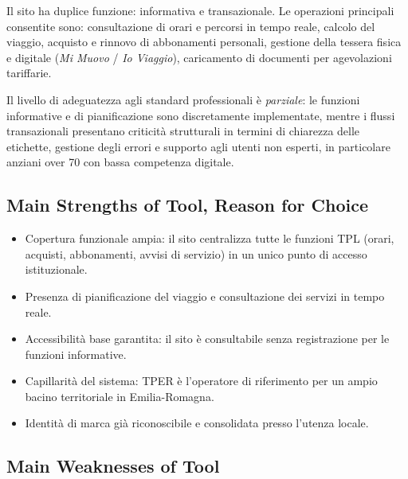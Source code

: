 \documentclass[11pt,a4paper]{article}
\begin{document}
\noindent Il sito ha duplice funzione: informativa e transazionale. Le operazioni principali consentite sono: consultazione di orari e percorsi in tempo reale, calcolo del viaggio, acquisto e rinnovo di abbonamenti personali, gestione della tessera fisica e digitale (\textit{Mi Muovo} / \textit{Io Viaggio}), caricamento di documenti per agevolazioni tariffarie.

\noindent Il livello di adeguatezza agli standard professionali è \textit{parziale}: le funzioni informative e di pianificazione sono discretamente implementate, mentre i flussi transazionali presentano criticità strutturali in termini di chiarezza delle etichette, gestione degli errori e supporto agli utenti non esperti, in particolare anziani over 70 con bassa competenza digitale.

\subsection*{Main Strengths of Tool, Reason for Choice}

\begin{itemize}
    \item Copertura funzionale ampia: il sito centralizza tutte le funzioni TPL (orari, acquisti, abbonamenti, avvisi di servizio) in un unico punto di accesso istituzionale.
    \item Presenza di pianificazione del viaggio e consultazione dei servizi in tempo reale.
    \item Accessibilità base garantita: il sito è consultabile senza registrazione per le funzioni informative.
    \item Capillarità del sistema: TPER è l'operatore di riferimento per un ampio bacino territoriale in Emilia-Romagna.
    \item Identità di marca già riconoscibile e consolidata presso l’utenza locale.
\end{itemize}

\subsection*{Main Weaknesses of Tool}
\end{document}
